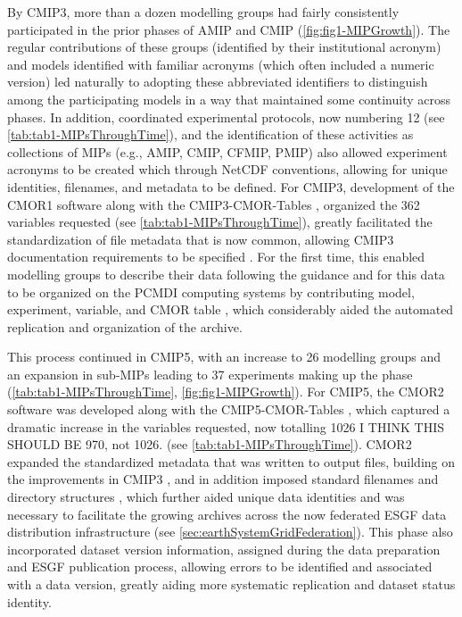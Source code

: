 \documentclass[gmd, preprint]{copernicus}
\begin{document}
By CMIP3, more than a dozen modelling groups had fairly consistently participated in the prior phases of AMIP and CMIP (\autoref{fig:fig1-MIPGrowth}). The regular contributions of these groups (identified by their institutional acronym) and models identified with familiar acronyms (which often included a numeric version) led naturally to adopting these abbreviated identifiers to distinguish among the participating models in a way that maintained some continuity across phases. In addition, coordinated experimental protocols, now numbering 12 (see \autoref{tab:tab1-MIPsThroughTime}), and the identification of these activities as collections of MIPs (e.g., AMIP, CMIP, CFMIP, PMIP) also allowed experiment acronyms to be created which through NetCDF conventions, allowing for unique identities, filenames, and metadata to be defined. For CMIP3, development of the CMOR1 software \citep{taylor_cmor_2006} along with the CMIP3-CMOR-Tables \citep{doutriaux_cmip3_2005}, organized the 362 variables requested (see \autoref{tab:tab1-MIPsThroughTime}), greatly facilitated the standardization of file metadata that is now common, allowing CMIP3 documentation requirements to be specified \citep{taylor_pcmdi_2005}. For the first time, this enabled modelling groups to describe their data following the guidance and for this data to be organized on the PCMDI computing systems by contributing model, experiment, variable, and CMOR table \citep{doutriaux_cmip3_2005}, which considerably aided the automated replication and organization of the archive.

This process continued in CMIP5, with an increase to 26 modelling groups and an expansion in sub-MIPs leading to 37 experiments making up the phase (\autoref{tab:tab1-MIPsThroughTime}, \autoref{fig:fig1-MIPGrowth}).  For CMIP5, the CMOR2 software was developed \citep{doutriaux_cmor_2011} along with the CMIP5-CMOR-Tables \citep{doutriaux_cmip5_2013}, which captured a dramatic increase in the variables requested, now totalling 1026 {\color{red} I THINK THIS SHOULD BE 970, not 1026.} (see \autoref{tab:tab1-MIPsThroughTime}). CMOR2 expanded the standardized metadata that was written to output files, building on the improvements in CMIP3 \citep{taylor_pcmdi_2010}, and in addition imposed standard filenames and directory structures \citep{taylor_pcmdi_2012}, which further aided unique data identities and was necessary to facilitate the growing archives across the now federated ESGF data distribution infrastructure (see \autoref{sec:earthSystemGridFederation}). This phase also incorporated dataset version information, assigned during the data preparation and ESGF publication process, allowing errors to be identified and associated with a data version, greatly aiding more systematic replication and dataset status identity. 
\end{document}
